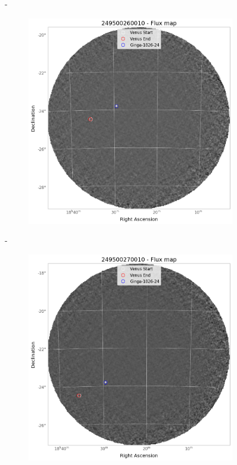\documentclass[
	a4paper, %
	10pt, %
	unnumberedsections, %
	twoside, %
]{LTJournalArticle}
\begin{document}
\begin{figure}[H]
\begin{subfigure}{.45\textwidth}
        \end{subfigure}
        \hspace{1em}-
        \begin{subfigure}{.45\textwidth}
            \centering
            \includegraphics[width=\textwidth]{report/Figures/methods/2404/26_map.png}
        \end{subfigure}
        \hspace{1em}-
        \begin{subfigure}{.45\textwidth}
            \centering
            \includegraphics[width=\textwidth]{report/Figures/methods/2404/27_map.png}

\end{subfigure}
\end{figure}
\end{document}
